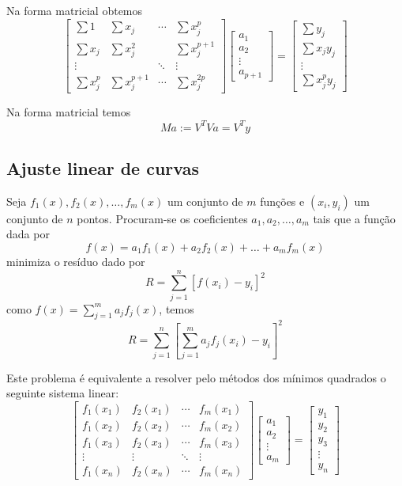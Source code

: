 Na forma matricial obtemos
\begin{equation}
  \begin{bmatrix}
     \sum 1     &  \sum  x_j   & \cdots & \sum x_j^p\\
     \sum x_j   &  \sum  x_j^2 &        & \sum x_j^{p+1}\\
     \vdots     &              & \ddots & \vdots    \\
     \sum x_j^p &  \sum  x_j^{p+1} & \cdots & \sum x_j^{2p}
  \end{bmatrix}
  \begin{bmatrix}
     a_1 \\
     a_2 \\
     \vdots \\
     a_{p+1}
  \end{bmatrix}=
  \begin{bmatrix}
     \sum y_j \\
     \sum x_j y_j \\
     \vdots \\
     \sum x_j^p y_j 
  \end{bmatrix}
\end{equation}

Na forma matricial temos 
\begin{equation}
   Ma := V^TV a = V^Ty
\end{equation}




\subsection{Ajuste linear de curvas}
Seja $f_1(x), f_2(x),\ldots, f_m(x)$ um conjunto de $m$ funções e $(x_i,y_i)$ um conjunto de $n$ pontos. Procuram-se os coeficientes $a_1,a_2,\ldots, a_m$ tais que a função dada por
$$f(x)=a_1f_1(x)+a_2f_2(x)+\ldots+a_mf_m(x)$$
minimiza o resíduo dado por
$$R= \sum_{j=1}^n \left[f(x_i)-y_i\right]^2$$
como $f(x)=\sum_{j=1}^m a_jf_j(x)$, temos
$$R= \sum_{j=1}^n \left[\sum_{j=1}^m a_jf_j(x_i)-y_i\right]^2$$

Este problema é equivalente a resolver pelo métodos dos mínimos quadrados o seguinte sistema linear:
$$
\left[
\begin{array}{cccc}
f_1(x_1)&f_2(x_1) & \cdots & f_m(x_1)\\
f_1(x_2)&f_2(x_2) & \cdots & f_m(x_2)\\
f_1(x_3)&f_2(x_3) & \cdots & f_m(x_3)\\
\vdots & \vdots & \ddots & \vdots\\
f_1(x_n)&f_2(x_n) & \cdots & f_m(x_n)
\end{array}
\right]
\left[
\begin{array}{c}
a_1\\
a_2\\
\vdots\\
a_m
\end{array}
\right]=\left[\begin{array}{c}
y_1\\
y_2\\
y_3\\
\vdots\\
y_n
\end{array}
\right]
$$



